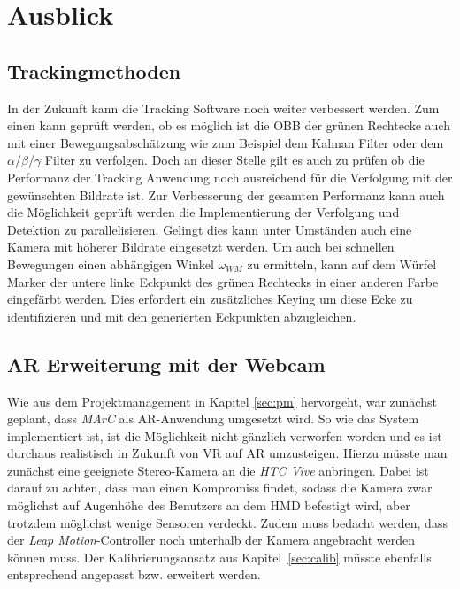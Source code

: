 \section{Ausblick}\label{sec:ausblick}
\subsection{Trackingmethoden}
In der Zukunft kann die Tracking Software noch weiter verbessert werden. Zum einen kann geprüft werden, ob es möglich ist die OBB der grünen Rechtecke auch mit einer Bewegungsabschätzung wie zum Beispiel dem Kalman Filter \cite{article:Kalman} oder dem $\alpha$/$\beta$/$\gamma$ Filter \cite{article:alphabetagamma} zu verfolgen. Doch an dieser Stelle gilt es auch zu prüfen ob die Performanz der Tracking Anwendung noch ausreichend für die Verfolgung mit der gewünschten Bildrate ist. Zur Verbesserung der gesamten Performanz kann auch die Möglichkeit geprüft werden die Implementierung der Verfolgung und Detektion zu parallelisieren. Gelingt dies kann unter Umständen auch eine Kamera mit höherer Bildrate eingesetzt werden.
Um auch bei schnellen Bewegungen einen abhängigen Winkel $\omega_{WM}$ zu ermitteln, kann auf dem Würfel Marker der untere linke Eckpunkt des grünen Rechtecks in einer anderen Farbe eingefärbt werden. Dies erfordert ein zusätzliches Keying um diese Ecke zu identifizieren und mit den generierten Eckpunkten abzugleichen.

\subsection{AR Erweiterung mit der Webcam} \label{sec:PlanedWebcam}
Wie aus dem Projektmanagement in Kapitel \ref{sec:pm} hervorgeht, war zunächst geplant, dass \textit{MArC} als AR-Anwendung umgesetzt wird. So wie das System implementiert ist, ist die Möglichkeit nicht gänzlich verworfen worden und es ist durchaus realistisch in Zukunft von VR auf AR umzusteigen. Hierzu müsste man zunächst eine geeignete Stereo-Kamera an die \textit{HTC Vive} anbringen. Dabei ist darauf zu achten, dass man einen Kompromiss findet, sodass die Kamera zwar möglichst auf Augenhöhe des Benutzers an dem HMD befestigt wird, aber trotzdem möglichst wenige Sensoren verdeckt. Zudem muss bedacht werden, dass der \textit{Leap Motion}-Controller noch unterhalb der Kamera angebracht werden können muss. Der Kalibrierungsansatz aus Kapitel~\ref{sec:calib} müsste ebenfalls entsprechend angepasst bzw. erweitert werden. 


